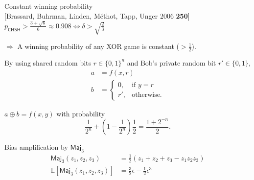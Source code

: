\documentclass{beamer}
\newcommand\emm[1]{\textcolor{redorange}{{#1}}}
\newcommand\numc[1]{\textcolor{citation}{{\bf #1}}}
\begin{document}
\begin{frame}{Constant winning probability\\{\small [Brassard, Buhrman, Linden, M\'ethot, Tapp, Unger 2006 \numc{250}]}}
$p_\mathsf{CHSH}>\frac{3+\sqrt{6}}6\approx 0.908 \iff \delta > \sqrt{\frac23}$

 $\Longrightarrow$ A winning probability of any XOR game is \emm{constant ($> \frac12$)}.




\vspace{1em}
By using shared random bits $r\in\{0,1\}^n$ and Bob's private random bit $r'\in\{0,1\}$,
\begin{align*}
a &= f(x, r)\\
b &= \begin{cases}
0,& \text{if } y = r\\
r',& \text{otherwise.}
\end{cases}
\end{align*}

$a\oplus b = f(x,y)$ with probability
\begin{equation*}
\frac1{2^n} + \left(1-\frac1{2^n}\right)\frac12
=\frac{1+2^{-n}}{2}.
\end{equation*}


\end{frame}

\begin{frame}{Bias amplification by $\mathsf{Maj}_3$}
\vspace{-.5em}
\begin{align*}
\mathsf{Maj}_3(z_1,z_2,z_3) &= \frac12\left(z_1+z_2+z_3-z_1z_2z_3\right)\\
\mathbb{E}\left[\mathsf{Maj}_3(z_1,z_2,z_3)\right] &= \frac32\epsilon -\frac12\epsilon^3
\end{align*}
\begin{center}
\end{center}
\end{frame}
\end{document}
